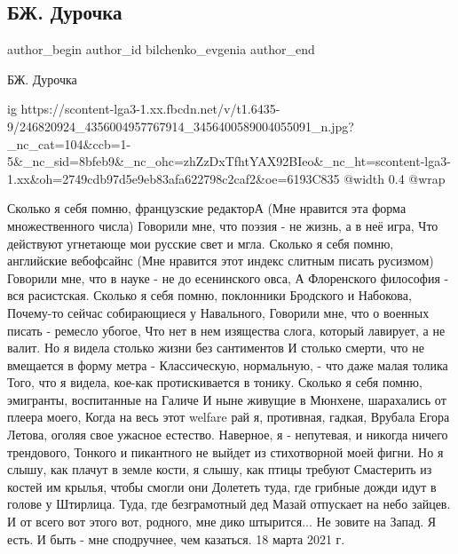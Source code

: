  
 
 
 
 
 
\subsection{БЖ. Дурочка}
\label{sec:18_10_2021.fb.bilchenko_evgenia.6.durochka}
 
\ifcmt
 author_begin
   author_id bilchenko_evgenia
 author_end
\fi

БЖ. Дурочка

\ifcmt
  ig https://scontent-lga3-1.xx.fbcdn.net/v/t1.6435-9/246820924_4356004957767914_3456400589004055091_n.jpg?_nc_cat=104&ccb=1-5&_nc_sid=8bfeb9&_nc_ohc=zhZzDxTfhtYAX92BIeo&_nc_ht=scontent-lga3-1.xx&oh=2749cdb97d5e9eb83afa622798c2caf2&oe=6193C835
  @width 0.4
  @wrap 
\fi

Сколько я себя помню, французские редакторА
(Мне нравится эта форма множественного числа)
Говорили мне, что поэзия -  не жизнь, а в неё игра,
Что действуют угнетающе мои русские свет и мгла.
Сколько я себя помню, английские вебофсайнс
(Мне нравится этот индекс слитным писать русизмом)
Говорили мне, что в науке - не до есенинского овса,
А Флоренского философия - вся расистская.
Сколько я себя помню, поклонники Бродского и Набокова,
Почему-то сейчас собирающиеся у Навального,
Говорили мне, что о военных писать - ремесло убогое,
Что нет в нем изящества слога, который лавирует, а не валит.
Но я видела столько жизни без сантиментов
И столько смерти, что не вмещается в форму метра -
Классическую, нормальную, - что даже малая толика
Того, что я видела, кое-как протискивается в тонику.
Сколько я себя помню, эмигранты, воспитанные на Галиче
И ныне живущие в Мюнхене, шарахались от плеера моего,
Когда на весь этот welfare рай я, противная, гадкая,
Врубала Егора Летова, оголяя свое ужасное естество.
Наверное, я - непутевая, и никогда ничего трендового,
Тонкого и пикантного не выйдет из стихотворной моей фигни.
Но я слышу, как плачут в земле кости, я слышу, как птицы требуют
Смастерить из костей им крылья, чтобы смогли они
Долететь туда, где грибные дожди идут в голове у Штирлица.
Туда, где безграмотный дед Мазай отпускает на небо зайцев.
И от всего вот этого вот, родного, мне дико штырится...
Не зовите на Запад. Я есть. И быть - мне сподручнее, чем казаться. 
18 марта 2021 г.

